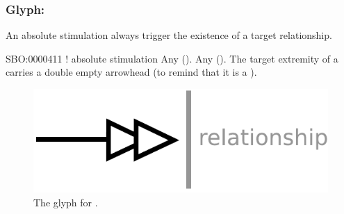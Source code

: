 \color{red}

\subsubsection{Glyph: }\label{sec:absoluteStimulation}

An absolute stimulation always trigger the existence of a target relationship. 

\begin{glyphDescription}
 \glyphSboTerm SBO:0000411 ! absolute stimulation
 \glyphOrigin Any  ().
 \glyphTarget Any  ().
 \glyphEndPoint The target extremity of a  carries a double empty arrowhead (to remind that it is a ).
 \end{glyphDescription}

\begin{figure}[H]
  \centering
  \includegraphics[scale = 0.5]{images/absoluteStimulation}
  \caption{The \PD glyph for .}
  \label{fig:absoluteStimulation}
\end{figure}


\normalcolor